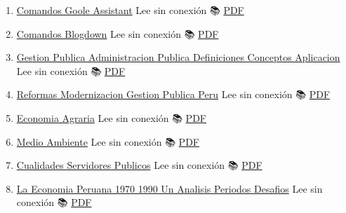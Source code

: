 \documentclass[
  jou,
  floatsintext,
  longtable,
  a4paper,
  nolmodern,
  notxfonts,
  notimes,
  colorlinks=true,linkcolor=blue,citecolor=blue,urlcolor=blue]{apa7}
\providecommand{\tightlist}{%
  \setlength{\itemsep}{0pt}\setlength{\parskip}{0pt}}
\begin{document}
\begin{enumerate}
\def\labelenumi{\arabic{enumi}.}
\tightlist
\item
  \href{https://achalmaedison.netlify.app/blog/posts/2020-05-23-comandos-goole-assistant}{Comandos
  Goole Assistant} Lee sin conexión 📚
  \href{https://achalmaedison.netlify.app/blog/posts/2020-05-23-comandos-goole-assistant/index.pdf}{PDF}
\item
  \href{https://achalmaedison.netlify.app/blog/posts/2021-07-14-comandos-blogdown}{Comandos
  Blogdown} Lee sin conexión 📚
  \href{https://achalmaedison.netlify.app/blog/posts/2021-07-14-comandos-blogdown/index.pdf}{PDF}
\item
  \href{https://achalmaedison.netlify.app/blog/posts/2021-10-01-gestion-publica-administracion-publica-definiciones-conceptos-aplicacion}{Gestion
  Publica Administracion Publica Definiciones Conceptos Aplicacion} Lee
  sin conexión 📚
  \href{https://achalmaedison.netlify.app/blog/posts/2021-10-01-gestion-publica-administracion-publica-definiciones-conceptos-aplicacion/index.pdf}{PDF}
\item
  \href{https://achalmaedison.netlify.app/blog/posts/2021-10-01-reformas-modernizacion-gestion-publica-peru}{Reformas
  Modernizacion Gestion Publica Peru} Lee sin conexión 📚
  \href{https://achalmaedison.netlify.app/blog/posts/2021-10-01-reformas-modernizacion-gestion-publica-peru/index.pdf}{PDF}
\item
  \href{https://achalmaedison.netlify.app/blog/posts/2022-04-22-economia-agraria}{Economia
  Agraria} Lee sin conexión 📚
  \href{https://achalmaedison.netlify.app/blog/posts/2022-04-22-economia-agraria/index.pdf}{PDF}
\item
  \href{https://achalmaedison.netlify.app/blog/posts/2022-06-02-medio-ambiente}{Medio
  Ambiente} Lee sin conexión 📚
  \href{https://achalmaedison.netlify.app/blog/posts/2022-06-02-medio-ambiente/index.pdf}{PDF}
\item
  \href{https://achalmaedison.netlify.app/blog/posts/2023-05-11-cualidades-servidores-publicos}{Cualidades
  Servidores Publicos} Lee sin conexión 📚
  \href{https://achalmaedison.netlify.app/blog/posts/2023-05-11-cualidades-servidores-publicos/index.pdf}{PDF}
\item
  \href{https://achalmaedison.netlify.app/blog/posts/2023-05-12-la-economia-peruana-1970-1990-un-analisis-periodos-desafios}{La
  Economia Peruana 1970 1990 Un Analisis Periodos Desafios} Lee sin
  conexión 📚
  \href{https://achalmaedison.netlify.app/blog/posts/2023-05-12-la-economia-peruana-1970-1990-un-analisis-periodos-desafios/index.pdf}{PDF}

\end{enumerate}
\end{document}
